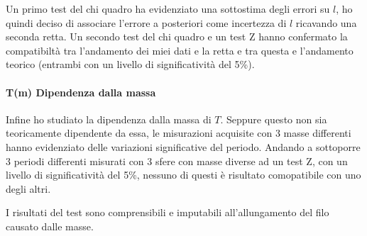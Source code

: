 \documentclass{article}
\begin{document}
	Un primo test del chi quadro ha evidenziato una sottostima degli errori su $l$, ho quindi deciso di associare l'errore a posteriori come incertezza di $l$ ricavando una seconda retta. Un secondo test del chi quadro e un test Z hanno confermato la compatibiltà tra l'andamento dei miei dati e la retta e tra questa e l'andamento teorico (entrambi con un livello di significatività del 5\%).
	
	\paragraph{T(m) Dipendenza dalla massa}
	Infine ho studiato la dipendenza dalla massa di $T$. Seppure questo non sia teoricamente dipendente da essa, le misurazioni acquisite con 3 masse differenti hanno evidenziato delle variazioni significative del periodo. Andando a sottoporre 3 periodi differenti misurati con 3 sfere con masse diverse ad un test Z, con un livello di significatività del 5\%, nessuno di questi è risultato comopatibile con uno degli altri.
	
	I risultati del test sono comprensibili e imputabili all'allungamento del filo causato dalle masse.
	
	
\end{document}
